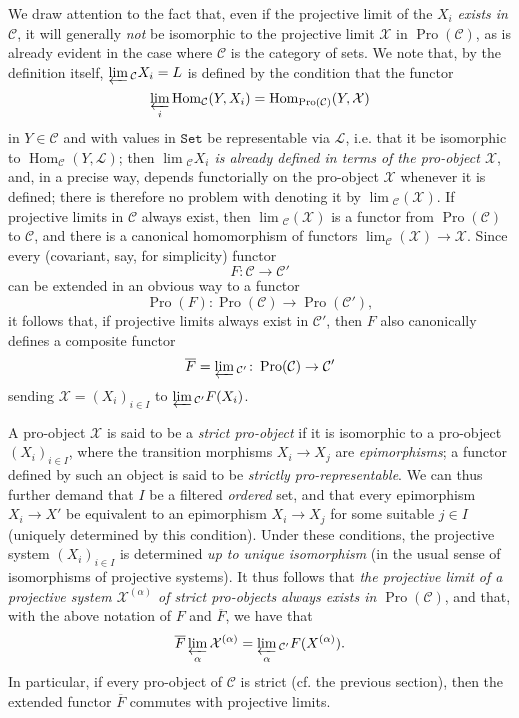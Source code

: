 We draw attention to the fact that, even if the projective limit of the $X_i$ \emph{exists in $\mathcal{C}$}, it will generally \emph{not} be isomorphic to the projective limit $\mathcal{X}$ in $\operatorname{Pro}(\mathcal{C})$, as is already evident in the case where $\mathcal{C}$ is the category of sets.
We note that, by the definition itself, $\varprojlim{}_{\mathcal{C}}X_i=L$ is defined by the condition that the functor
\[
    \varprojlim_i\operatorname{Hom}_{\mathcal{C}}(Y,X_i)
    = \operatorname{Hom}_{\operatorname{Pro}(\mathcal{C})}(Y,\mathcal{X})
\]
in $Y\in\mathcal{C}$ and with values in $\mathtt{Set}$ be representable via $\mathcal{L}$, i.e. that it be isomorphic to $\operatorname{Hom}_{\mathcal{C}}(Y,\mathcal{L})$;
then \emph{$\lim{}_{\mathcal{C}}X_i$ is already defined in terms of the \emph{pro-object} $\mathcal{X}$}, and, in a precise way, depends functorially on the pro-object $\mathcal{X}$ whenever it is defined;
there is therefore no problem with denoting it by $\lim{}_{\mathcal{C}}(\mathcal{X})$.
If projective limits in $\mathcal{C}$ always exist, then $\lim{}_{\mathcal{C}}(\mathcal{X})$ is a functor from $\operatorname{Pro}(\mathcal{C})$ to $\mathcal{C}$, and there is a canonical homomorphism of functors $\lim_\mathcal{C}(\mathcal{X})\to\mathcal{X}$.
Since every (covariant, say, for simplicity) functor
\[
    F\colon \mathcal{C} \to \mathcal{C}'
\]
can be extended in an obvious way to a functor
\[
    \operatorname{Pro}(F)\colon \operatorname{Pro}(\mathcal{C}) \to \operatorname{Pro}(\mathcal{C}'),
\]
it follows that, if projective limits always exist in $\mathcal{C}'$, then $F$ also canonically defines a composite functor
\[
    \overline{F}
    = \varprojlim{}_{\mathcal{C}'}\colon \operatorname{Pro}(\mathcal{C}) \to \mathcal{C}'
\]
sending $\mathcal{X}=(X_i)_{i\in I}$ to $\varprojlim{}_{\mathcal{C}'}F(X_i)$.

A pro-object $\mathcal{X}$ is said to be a \emph{strict pro-object} if it is isomorphic to a pro-object $(X_i)_{i\in I}$, where the transition morphisms $X_i\to X_j$ are \emph{epimorphisms};
a functor defined by such an object is said to be \emph{strictly pro-representable}.
We can thus further demand that $I$ be a filtered \emph{ordered} set, and that every epimorphism $X_i\to X'$ be equivalent to an epimorphism $X_i\to X_j$ for some suitable $j\in I$ (uniquely determined by this condition).
Under these conditions, the projective system $(X_i)_{i\in I}$ is determined \emph{up to unique isomorphism} (in the usual sense of isomorphisms of projective systems).
It thus follows that \emph{the projective limit of a projective system $\mathcal{X}^{(\alpha)}$ of strict pro-objects always exists in $\operatorname{Pro}(\mathcal{C})$}, and that, with the above notation of $F$ and $\overline{F}$, we have that
\[
    \overline{F}\varprojlim_\alpha\mathcal{X}^{(\alpha)}
    = \varprojlim_\alpha{}_{\mathcal{C}'}F(X^{(\alpha)}).
\]
In particular, if every pro-object of $\mathcal{C}$ is strict (cf. the previous section), then the extended functor $\overline{F}$ commutes with projective limits.

